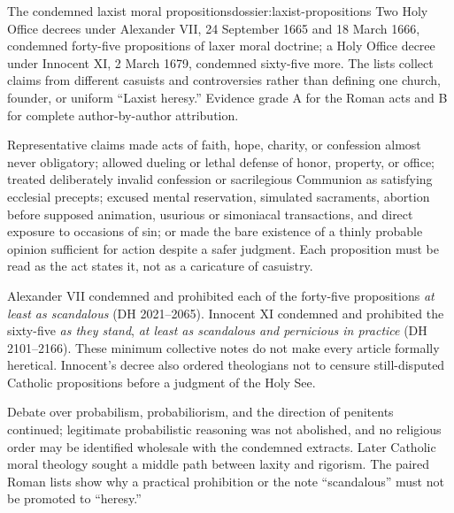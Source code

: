 \begin{heresydossier}{The condemned laxist moral propositions}{dossier:laxist-propositions}
\objectfield Two Holy Office decrees under Alexander VII, 24 September 1665 and 18 March 1666, condemned forty-five propositions of laxer moral doctrine; a Holy Office decree under Innocent XI, 2 March 1679, condemned sixty-five more. The lists collect claims from different casuists and controversies rather than defining one church, founder, or uniform ``Laxist heresy.'' Evidence grade A for the Roman acts and B for complete author-by-author attribution.

\propositionfield Representative claims made acts of faith, hope, charity, or confession almost never obligatory; allowed dueling or lethal defense of honor, property, or office; treated deliberately invalid confession or sacrilegious Communion as satisfying ecclesial precepts; excused mental reservation, simulated sacraments, abortion before supposed animation, usurious or simoniacal transactions, and direct exposure to occasions of sin; or made the bare existence of a thinly probable opinion sufficient for action despite a safer judgment. Each proposition must be read as the act states it, not as a caricature of casuistry.

\responsefield Alexander VII condemned and prohibited each of the forty-five propositions \emph{at least as scandalous} (DH 2021--2065). Innocent XI condemned and prohibited the sixty-five \emph{as they stand}, \emph{at least as scandalous and pernicious in practice} (DH 2101--2166). These minimum collective notes do not make every article formally heretical. Innocent's decree also ordered theologians not to censure still-disputed Catholic propositions before a judgment of the Holy See.

\aftermathfield Debate over probabilism, probabiliorism, and the direction of penitents continued; legitimate probabilistic reasoning was not abolished, and no religious order may be identified wholesale with the condemned extracts. Later Catholic moral theology sought a middle path between laxity and rigorism. The paired Roman lists show why a practical prohibition or the note ``scandalous'' must not be promoted to ``heresy.''
\end{heresydossier}

